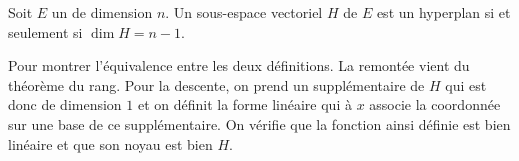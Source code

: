 \documentclass{magnolia}
\begin{document}






\begin{proposition}[utile=1]
Soit $E$ un \Kev de dimension $n$. Un sous-espace vectoriel $H$ de $E$ est
un hyperplan si et seulement si $\dim H=n-1$.
\end{proposition}

\begin{preuve}
Pour montrer l'équivalence entre les deux définitions. La remontée vient du théorème du rang.
Pour la descente, on prend un supplémentaire de $H$ qui est donc de dimension $1$ et on définit la forme linéaire qui à $x$ associe la coordonnée sur une base de ce supplémentaire. On vérifie que la fonction ainsi définie est bien linéaire et que son noyau est bien $H$.
\end{preuve}
\end{document}

